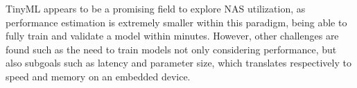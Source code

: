 \documentclass[10pt,        %
               a4paper,     %
               journal,     %
               ]{IEEEtran}
\begin{document}
TinyML appears to be a promising field to explore NAS utilization, as performance estimation is extremely smaller within
this paradigm, being able to fully train and validate a model within minutes. However, other challenges are found such as
the need to train models not only considering performance, but also subgoals such as latency and parameter size, which
translates respectively to speed and memory on an embedded device.

\newpage



%
\end{document}
